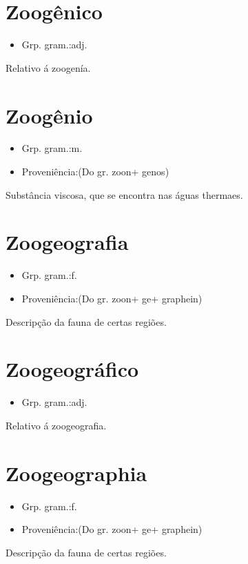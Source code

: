 \section{Zoogênico}
\begin{itemize}
\item {Grp. gram.:adj.}
\end{itemize}
Relativo á zoogenía.
\section{Zoogênio}
\begin{itemize}
\item {Grp. gram.:m.}
\end{itemize}
\begin{itemize}
\item {Proveniência:(Do gr. \textunderscore zoon\textunderscore  + \textunderscore genos\textunderscore )}
\end{itemize}
Substância viscosa, que se encontra nas águas thermaes.
\section{Zoogeografia}
\begin{itemize}
\item {Grp. gram.:f.}
\end{itemize}
\begin{itemize}
\item {Proveniência:(Do gr. \textunderscore zoon\textunderscore  + \textunderscore ge\textunderscore  + \textunderscore graphein\textunderscore )}
\end{itemize}
Descripção da fauna de certas regiões.
\section{Zoogeográfico}
\begin{itemize}
\item {Grp. gram.:adj.}
\end{itemize}
Relativo á zoogeografia.
\section{Zoogeographia}
\begin{itemize}
\item {Grp. gram.:f.}
\end{itemize}
\begin{itemize}
\item {Proveniência:(Do gr. \textunderscore zoon\textunderscore  + \textunderscore ge\textunderscore  + \textunderscore graphein\textunderscore )}
\end{itemize}
Descripção da fauna de certas regiões.
